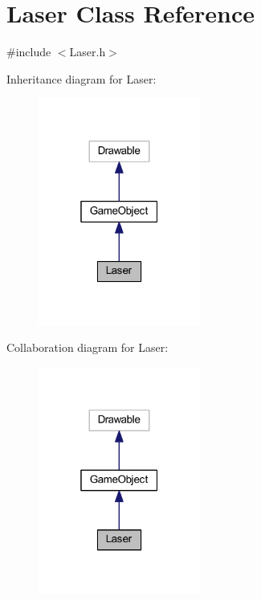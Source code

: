 \hypertarget{class_laser}{}\section{Laser Class Reference}
\label{class_laser}


{\ttfamily \#include $<$Laser.\+h$>$}



Inheritance diagram for Laser\+:
\nopagebreak
\begin{figure}[H]
\begin{center}
\leavevmode
\includegraphics[width=151pt]{class_laser__inherit__graph}
\end{center}
\end{figure}


Collaboration diagram for Laser\+:
\nopagebreak
\begin{figure}[H]
\begin{center}
\leavevmode
\includegraphics[width=151pt]{class_laser__coll__graph}
\end{center}
\end{figure}
